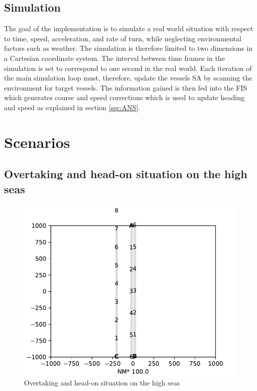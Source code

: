 \section{Simulation}
The goal of the implementation is to  simulate a real world situation with respect to time, speed, acceleration, and rate of turn, while neglecting  environmental factors such as weather.
The simulation is therefore limited to two dimensions in a Cartesian coordinate system.
The interval between time frames in the simulation is set to correspond to one second in the real world.
Each iteration of the main simulation loop must, therefore, update the vessels SA by scanning the environment for target vessels. The information gained is then fed into the FIS which generates course and speed corrections which is used to update heading and speed as explained in section \ref{sec:ANS}.
\chapter{Scenarios}

\section{Overtaking and head-on situation on the high seas}
\begin{figure}[H]
    \centering
    \includegraphics[width=\textwidth,height=0.75\textheight,keepaspectratio]{Figures/Scenario/overtaking-and-head-on.pdf}
    \caption{Overtaking and head-on situation on the high seas  \cite{ecolreg_overtaking-and-head-on}}
    \label{fig:overtaking-and-head-on}
\end{figure}
